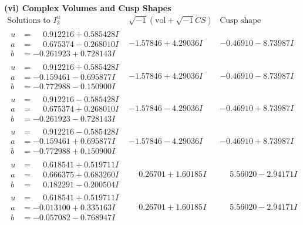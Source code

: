 \documentclass[1p]{elsarticle_modified}
\theoremstyle{definition}
\newcommand{\I}{\sqrt{-1}}
\begin{document}
\newpage\flushleft \textbf{(vi) Complex Volumes and Cusp Shapes}
$$\begin{array}{c|c|c}  
\text{Solutions to }I^u_{3}& \I (\text{vol} + \sqrt{-1}CS) & \text{Cusp shape}\\
 \hline 
\begin{aligned}
u &= \phantom{-}0.912216 + 0.585428 I \\
a &= \phantom{-}0.675374 - 0.268010 I \\
b &= -0.261923 + 0.728143 I\end{aligned}
 & -1.57846 + 4.29036 I & -0.46910 - 8.73987 I \\ \hline\begin{aligned}
u &= \phantom{-}0.912216 + 0.585428 I \\
a &= -0.159461 - 0.695877 I \\
b &= -0.772988 - 0.150900 I\end{aligned}
 & -1.57846 + 4.29036 I & -0.46910 - 8.73987 I \\ \hline\begin{aligned}
u &= \phantom{-}0.912216 - 0.585428 I \\
a &= \phantom{-}0.675374 + 0.268010 I \\
b &= -0.261923 - 0.728143 I\end{aligned}
 & -1.57846 - 4.29036 I & -0.46910 + 8.73987 I \\ \hline\begin{aligned}
u &= \phantom{-}0.912216 - 0.585428 I \\
a &= -0.159461 + 0.695877 I \\
b &= -0.772988 + 0.150900 I\end{aligned}
 & -1.57846 - 4.29036 I & -0.46910 + 8.73987 I \\ \hline\begin{aligned}
u &= \phantom{-}0.618541 + 0.519711 I \\
a &= \phantom{-}0.666375 + 0.683260 I \\
b &= \phantom{-}0.182291 - 0.200504 I\end{aligned}
 & \phantom{-}0.26701 + 1.60185 I & \phantom{-}5.56020 - 2.94171 I \\ \hline\begin{aligned}
u &= \phantom{-}0.618541 + 0.519711 I \\
a &= -0.013100 + 0.335163 I \\
b &= -0.057082 - 0.768947 I\end{aligned}
 & \phantom{-}0.26701 + 1.60185 I & \phantom{-}5.56020 - 2.94171 I \\ \hline\begin{aligned}

\end{aligned}
\end{array}$$
\end{document}
